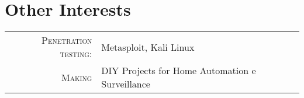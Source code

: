 %
%
%

\section{\texorpdfstring{\color{Blue}Other Interests}{Centres d'intérêts}}
\begin{tabular}{rl}
    \textsc{Penetration testing:} & Metasploit, Kali Linux\\
    \textsc{Making} & DIY Projects for Home Automation e Surveillance \\
\end{tabular}
